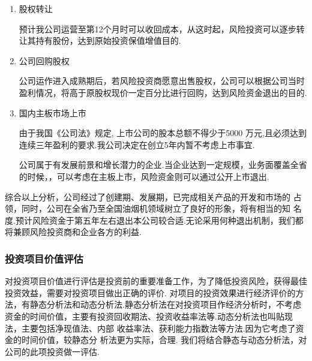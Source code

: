 \begin{enumerate}
\item 股权转让

      预计我公司运营至第12个月时可以收回成本，从这时起，风险投资可以逐步转 让其持有股份，达到原始投资保值增值目的.

\item 公司回购股权

      公司运作进入成熟期后，若风险投资商愿意出售股权，公司可以根据公司当时 盈利情况，将高于原股权现价一定百分比进行回购，达到风险资金退出的目的.

\item 国内主板市场上市

      由于我国《公司法》规定, 上市公司的股本总额不得少于5000 万元,且必须达到连续三年盈利的要求.我公司决定在创立5年内暂不考虑上市事宜.

      公司属于有发展前景和增长潜力的企业.当企业达到一定规模，业务面覆盖全省的时候，，可以考虑在主板上市，风险资金则可以通过公开上市退出.

\end{enumerate}

综合以上分析，公司经过了创建期、发展期，已完成相关产品的开发和市场的 占领，同时，公司在全省乃至全国油烟机领域树立了良好的形象，将有相当的知 名度.预计风险资金于第五年左右退出本公司较合适.无论采用何种退出机制，我们都将兼顾风险投资商和企业各方的利益.

\subsubsection{投资项目价值评估}
对投资项目价值进行评估是投资前的重要准备工作，为了降低投资风险，获得最佳投资效益，需要对投资项目做出正确的评价.
对项目的投资效果进行经济评价的方法，有静态分析法和动态分析法.静态分析法在对投资项目作经济分析时，不考虑资金的时间价值，主要有投资回收期法、投资收益率法等.动态分析法也叫贴现法，主要包括净现值法、内部 收益率法、获利能力指数法等方法.因为它考虑了资金的时间价值，较静态分 析法更为实际，合理.
我们将结合静态与动态分析法，对公司的此项投资做一评估.


